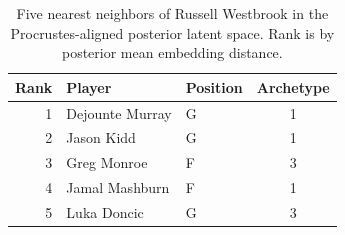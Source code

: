 \begin{table}[htbp]
  \centering\small
  \begin{tabular}{rllc}
    \toprule
    Rank & Player & Position & Archetype \\
    \midrule
    1 & Dejounte Murray & G & 1 \\
    2 & Jason Kidd & G & 1 \\
    3 & Greg Monroe & F & 3 \\
    4 & Jamal Mashburn & F & 1 \\
    5 & Luka Doncic & G & 3 \\
    \bottomrule
  \end{tabular}
  \caption{Five nearest neighbors of Russell Westbrook in the Procrustes-aligned posterior latent space. Rank is by posterior mean embedding distance.}
  \label{tab:Russell_Westbrook_neighbors}
\end{table}

